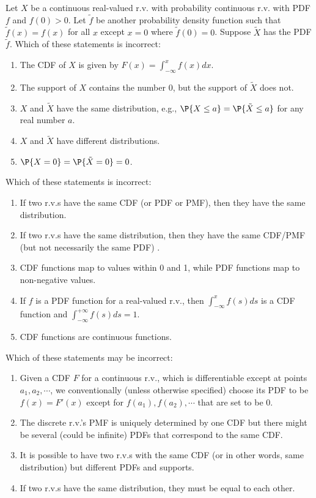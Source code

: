 \documentclass[poll_tutorial_format]{subfiles}
\begin{document}
	
		\begin{exercise}
		Let $X$ be a continuous real-valued r.v. with probability continuous r.v. with PDF $f$ and $f(0)> 0$. Let $\tilde{f}$ be another probability density function such that  $\tilde{f}(x)=f(x)$ for all $x$ except $x=0$ where $\tilde{f}(0)=0$.   Suppose $\tilde{X}$ has the PDF $\tilde{f}$.	
		Which of these statements is incorrect: 
		\begin{enumerate}
			\item The CDF of $X$ is given by $F(x)=\int_{-\infty}^{x}f(x)dx$.
			\item The support of $X$ contains the number $0$, but the support of $\tilde{X}$ does not.
			\item $X$ and $\tilde{X}$ have the same distribution, e.g., $\P{X \leq a }=\P{\tilde{X} \leq a}$ for any real number $a$.
 			\item $X$ and $\tilde{X}$ have different distributions.
 			\item $\P{X=0}=\P{\tilde{X}=0}=0$.
		\end{enumerate}
	\end{exercise}
	
	
	\begin{exercise}
		Which of these statements is incorrect: 
		\begin{enumerate}
			\item If two r.v.s have the same CDF (or PDF or PMF), then they have the same distribution.
			\item If two r.v.s have the same distribution, then they have the same CDF/PMF (but not necessarily the same PDF) .
			\item CDF functions map to values within 0 and 1, while PDF functions map to non-negative values. 
			\item If $f$ is a PDF function for a real-valued r.v.,  then $\int_{-\infty}^{x}f(s)ds$ is a CDF function and  $\int_{-\infty}^{+\infty}f(s)ds=1$.
			\item CDF functions are continuous functions. 
		\end{enumerate}
	\end{exercise}

\begin{exercise}
	Which of these statements may be incorrect: 
	\begin{enumerate}
		\item Given a CDF $F$ for a continuous r.v., which is differentiable except at points $a_1, a_2, \cdots$, we conventionally (unless otherwise specified) choose its PDF to be $f(x)=F'(x)$ except for  $f(a_1), f(a_2), \cdots$ that are set to be 0.
		\item The discrete r.v.'s PMF is uniquely determined by one CDF but there might be several (could be infinite) PDFs that correspond to the same CDF.   
		\item It is possible to have two r.v.s with the same CDF (or in other words, same distribution) but different PDFs and supports. 
		\item If two r.v.s have the same distribution, they must be equal to each other.
	\end{enumerate}
\end{exercise}
	
\end{document}
